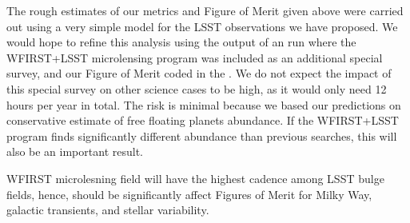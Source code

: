 The rough estimates of our metrics and Figure of Merit given above were
carried out using a very simple model for the LSST observations we
have proposed. We would hope to refine this analysis using the output
of an \OpSim run where the WFIRST+LSST microlensing program was included
as an additional special survey, and our Figure of Merit coded in the
\MAF. We do not expect the impact of this special survey on other science cases
to be high, as it would only need 12 hours per year in total. The risk
is minimal because we based our predictions on conservative estimate of free 
floating planets abundance. If the WFIRST+LSST program finds significantly 
different abundance than previous searches, this will also be an important result.

WFIRST microlesning field will have the highest cadence among LSST bulge fields, 
hence, should be significantly affect Figures of Merit for Milky Way, 
galactic transients, and stellar variability.



\navigationbar
